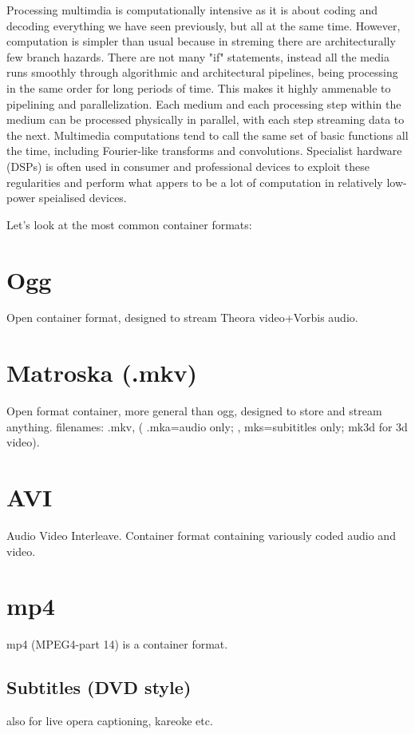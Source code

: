 \documentclass[oneside,english]{scrbook}
\begin{document}
Processing multimdia is computationally intensive as it is about coding and decoding everything we have seen previously, but all at the same time.   However, computation is simpler than usual because in streming there are architecturally few branch hazards.  There are not many "if" statements, instead all the media runs smoothly through algorithmic and architectural pipelines, being processing in the same order for long periods of time. This makes it highly ammenable to pipelining and parallelization.   Each medium and each processing step within the medium can be processed physically in parallel, with each step streaming data to the next.  Multimedia computations tend to call the same set of basic functions all the time, including Fourier-like transforms and convolutions.   Specialist hardware (DSPs) is often used in consumer and professional devices to exploit these regularities and perform what appers to be a lot of computation in relatively low-power speialised devices.

Let's look at the most common container formats:

\section{Ogg}
Open container format, designed to stream Theora video+Vorbis audio.

\section{Matroska (.mkv)}
Open format container, more general than ogg, designed to store and stream anything.
filenames: .mkv,  ( .mka=audio only; , mks=subititles only; mk3d for 3d video).

\section{AVI}
Audio Video Interleave. Container format containing variously coded audio and video.

\section{mp4}
mp4 (MPEG4-part 14) is a container format.

\subsection{Subtitles (DVD style)}
also for live opera captioning, kareoke etc.
\end{document}
